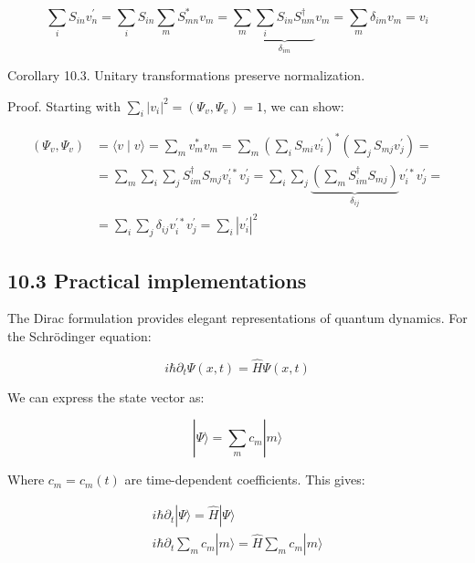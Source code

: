 \documentclass[italian]{HKNdocument}
\begin{document}
\begin{equation*}
\sum_{i} S_{i n} v_{n}^{\prime}=\sum_{i} S_{i n} \sum_{m} S_{m n}^{*} v_{m}=\sum_{m} \underbrace{\sum_{i} S_{i n} S_{n m}^{\dagger}}_{\delta_{i m}} v_{m}=\sum_{m} \delta_{i m} v_{m}=v_{i} \tag{10.18}
\end{equation*}

Corollary 10.3. Unitary transformations preserve normalization.

Proof. Starting with $\sum_{i}\left|v_{i}\right|^{2}=\left(\Psi_{v}, \Psi_{v}\right)=1$, we can show:

\begin{align*}
\left(\Psi_{v}, \Psi_{v}\right) & =\langle v \mid v\rangle=\sum_{m} v_{m}^{*} v_{m}=\sum_{m}\left(\sum_{i} S_{m i} v_{i}^{\prime}\right)^{*}\left(\sum_{j} S_{m j} v_{j}^{\prime}\right)= \\
& =\sum_{m} \sum_{i} \sum_{j} S_{i m}^{\dagger} S_{m j} v_{i}^{\prime*} v_{j}^{\prime}=\sum_{i} \sum_{j} \underbrace{\left(\sum_{m} S_{i m}^{\dagger} S_{m j}\right)}_{\delta_{i j}} v_{i}^{\prime*} v_{j}^{\prime}=  \tag{10.19}\\
& =\sum_{i} \sum_{j} \delta_{i j} v_{i}^{\prime*} v_{j}^{\prime}=\sum_{i}\left|v_{i}^{\prime}\right|^{2}
\end{align*}

\subsection*{10.3 Practical implementations}
The Dirac formulation provides elegant representations of quantum dynamics. For the Schrödinger equation:

\begin{equation*}
i \hbar \partial_{t} \Psi(x, t)=\hat{H} \Psi(x, t) \tag{10.20}
\end{equation*}

We can express the state vector as:

\begin{equation*}
|\Psi\rangle=\sum_{m} c_{m}|m\rangle \tag{10.21}
\end{equation*}

Where $c_{m}=c_{m}(t)$ are time-dependent coefficients. This gives:

\[
\begin{array}{r}
i \hbar \partial_{t}|\Psi\rangle=\hat{H}|\Psi\rangle \\
i \hbar \partial_{t} \sum_{m} c_{m}|m\rangle=\hat{H} \sum_{m} c_{m}|m\rangle \tag{10.22}
\end{array}
\]
\end{document}

